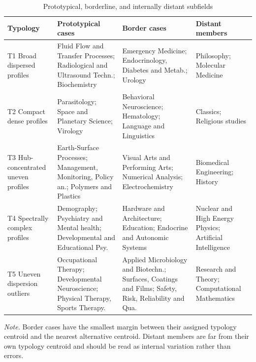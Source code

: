 \begin{table}[H]
\centering
\caption[Prototypical and borderline typology cases]{Prototypical, borderline, and internally distant subfields}
\label{tab:typology_examples}
\scriptsize
\begingroup
\setlength{\tabcolsep}{2.5pt}
\begin{tabular}{@{}>{\raggedright\arraybackslash}p{} >{\raggedright\arraybackslash}p{} >{\raggedright\arraybackslash}p{} >{\raggedright\arraybackslash}p{}@{}}
\hline
\textbf{Typology} & \textbf{Prototypical cases} & \textbf{Border cases} & \textbf{Distant members} \\
\hline
T1 Broad dispersed profiles & Fluid Flow and Transfer Processes; Radiological and Ultrasound Techn.; Biochemistry & Emergency Medicine; Endocrinology, Diabetes and Metab.; Urology & Philosophy; Molecular Medicine \\
T2 Compact dense profiles & Parasitology; Space and Planetary Science; Virology & Behavioral Neuroscience; Hematology; Language and Linguistics & Classics; Religious studies \\
T3 Hub-concentrated uneven profiles & Earth-Surface Processes; Management, Monitoring, Policy an.; Polymers and Plastics & Visual Arts and Performing Arts; Numerical Analysis; Electrochemistry & Biomedical Engineering; History \\
T4 Spectrally complex profiles & Demography; Psychiatry and Mental health; Developmental and Educational Psy. & Hardware and Architecture; Education; Endocrine and Autonomic Systems & Nuclear and High Energy Physics; Artificial Intelligence \\
T5 Uneven dispersion outliers & Occupational Therapy; Developmental Neuroscience; Physical Therapy, Sports Therapy. & Applied Microbiology and Biotechn.; Surfaces, Coatings and Films; Safety, Risk, Reliability and Qua. & Research and Theory; Computational Mathematics \\
\hline
\end{tabular}
\endgroup
\par\vspace{0.15cm}
\footnotesize\textit{Note.} Border cases have the smallest margin between their assigned typology centroid and the nearest alternative centroid. Distant members are far from their own typology centroid and should be read as internal variation rather than errors.
\end{table}
